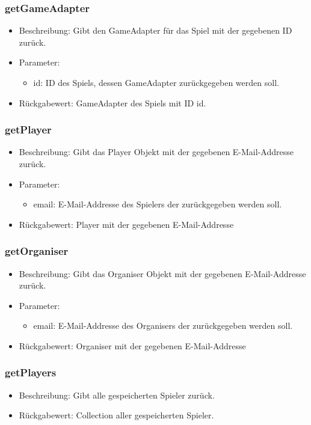 \documentclass[a4paper]{scrreprt}
\begin{document}
	\subsubsection{getGameAdapter}
	\begin{itemize}
		\item Beschreibung: Gibt den GameAdapter für das Spiel mit der gegebenen ID zurück.
		\item Parameter:
		\begin{itemize}
			\item id: ID des Spiels, dessen GameAdapter zurückgegeben werden soll.
		\end{itemize}
		\item Rückgabewert: GameAdapter des Spiels mit ID id.
	\end{itemize}

	\subsubsection{getPlayer}
	\begin{itemize}
		\item Beschreibung: Gibt das Player Objekt mit der gegebenen E-Mail-Addresse zurück.
		\item Parameter:
		\begin{itemize}
			\item email: E-Mail-Addresse des Spielers der zurückgegeben werden soll.
		\end{itemize}
		\item Rückgabewert: Player mit der gegebenen E-Mail-Addresse
	\end{itemize}


	\subsubsection{getOrganiser}
	\begin{itemize}
		\item Beschreibung: Gibt das Organiser Objekt mit der gegebenen E-Mail-Addresse zurück.
		\item Parameter:
		\begin{itemize}
			\item email: E-Mail-Addresse des Organisers der zurückgegeben werden soll.
		\end{itemize}
		\item Rückgabewert: Organiser mit der gegebenen E-Mail-Addresse
	\end{itemize}

	\subsubsection{getPlayers}
	\begin{itemize}
		\item Beschreibung: Gibt alle gespeicherten Spieler zurück.
		\item Rückgabewert: Collection aller gespeicherten Spieler.
	\end{itemize}
\end{document}
